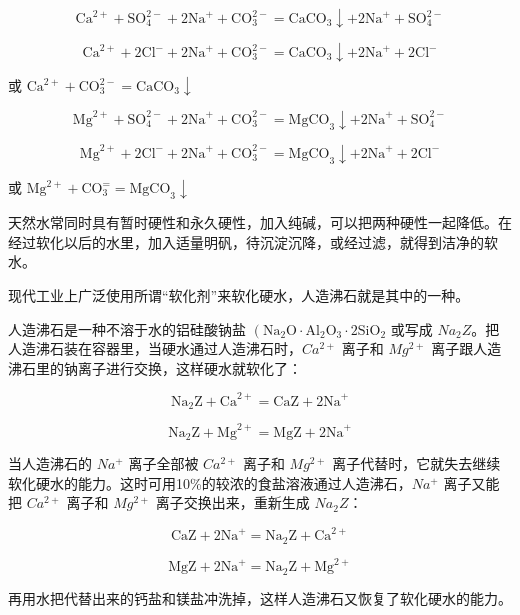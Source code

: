 \[
\mathrm{Ca} ^{2+} + \mathrm{SO} _ {4}^{2-} + 2 \mathrm{Na} ^ {+} + \mathrm{CO} _ {3}^{2-} = \mathrm{CaCO} _ {3} \downarrow + 2 \mathrm{Na} ^ {+} + \mathrm{SO} _ {4}^{2-}
\]

\[
\mathrm{Ca} ^{2+} + 2 \mathrm{Cl} ^ {-} + 2 \mathrm{Na} ^ {+} + \mathrm{CO} _ {3}^{2-} = \mathrm{CaCO} _ {3} \downarrow + 2 \mathrm{Na} ^ {+} + 2 \mathrm{Cl} ^ {-}
\]

或
\(\mathrm{Ca}^{2+} + \mathrm{CO}_{3}^{2-} = \mathrm{CaCO}_{3}\downarrow\)

\[
\mathrm{Mg} ^{2+} + \mathrm{SO} _ {4}^{2-} + 2 \mathrm{Na} ^ {+} + \mathrm{CO} _ {3}^{2-} = \mathrm{MgCO} _ {3} \downarrow + 2 \mathrm{Na} ^ {+} + \mathrm{SO} _ {4}^{2-}
\]

\[
\mathrm{Mg} ^{2+} + 2 \mathrm{Cl} ^ {-} + 2 \mathrm{Na} ^ {+} + \mathrm{CO} _ {3}^{2-} = \mathrm{MgCO} _ {3} \downarrow + 2 \mathrm{Na} ^ {+} + 2 \mathrm{Cl} ^ {-}
\]

或 \(\mathrm{Mg}^{2+} + \mathrm{CO}_3^= = \mathrm{MgCO}_3\downarrow\)

天然水常同时具有暂时硬性和永久硬性，加入纯碱，可以把两种硬性一起降低。在经过软化以后的水里，加入适量明矾，待沉淀沉降，或经过滤，就得到洁净的软水。

现代工业上广泛使用所谓``软化剂''来软化硬水，人造沸石就是其中的一种。

人造沸石是一种不溶于水的铝硅酸钠盐
\(\left(\mathrm{Na}_{2}\mathrm{O}\cdot\mathrm{Al}_{2}\mathrm{O}_{3}\cdot2\mathrm{SiO}_{2}\right.\)
或写成
\(Na_{2}Z\)。把人造沸石装在容器里，当硬水通过人造沸石时，\(Ca^{2+}\)
离子和 \(Mg^{2+}\) 离子跟人造沸石里的钠离子进行交换，这样硬水就软化了：

\[
\mathrm{Na} _ {2} \mathrm{Z} + \mathrm{Ca} ^{2+} = \mathrm{CaZ} + 2 \mathrm{Na} ^ {+}
\]

\[
\mathrm{Na} _ {2} \mathrm{Z} + \mathrm{Mg} ^{2+} = \mathrm{MgZ} + 2 \mathrm{Na} ^ {+}
\]

当人造沸石的 \(Na^{+}\) 离子全部被 \(Ca^{2+}\) 离子和 \(Mg^{2+}\)
离子代替时，它就失去继续软化硬水的能力。这时可用10\%的较浓的食盐溶液通过人造沸石，\(Na^{+}\)
离子又能把 \(Ca^{2+}\) 离子和 \(Mg^{2+}\) 离子交换出来，重新生成
\(Na_{2}Z\)：

\[
\mathrm{CaZ} + 2 \mathrm{Na} ^ {+} = \mathrm{Na} _ {2} \mathrm{Z} + \mathrm{Ca} ^{2+}
\]

\[
\mathrm{MgZ} + 2 \mathrm{Na} ^ {+} = \mathrm{Na} _ {2} \mathrm{Z} + \mathrm{Mg} ^{2+}
\]

再用水把代替出来的钙盐和镁盐冲洗掉，这样人造沸石又恢复了软化硬水的能力。

